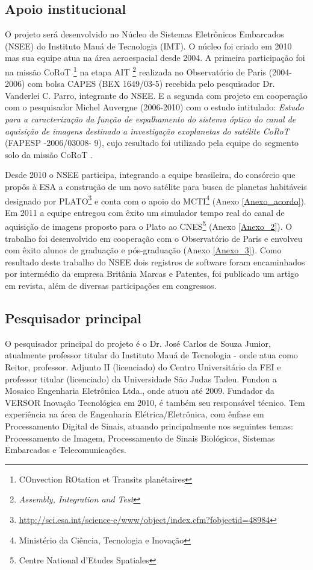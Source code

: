\subsection{Apoio institucional}
O projeto será desenvolvido no Núcleo de Sistemas Eletrônicos Embarcados (NSEE) do Instituto Mauá de Tecnologia (IMT). O núcleo foi criado em 2010 mas sua equipe atua  na área aeroespacial desde 2004. A primeira participação foi na missão CoRoT \footnote{COnvection ROtation et Transits planétaires} na etapa AIT \footnote{\textit{Assembly, Integration and Test}} realizada no Observatório de Paris (2004-2006) com bolsa CAPES (BEX 1649/03-5) recebida pelo pesquisador Dr. Vanderlei C. Parro, integrante do NSEE. E a segunda com projeto em cooperação com o pesquisador Michel Auvergne (2006-2010) com o estudo intitulado:  \textit{Estudo para a caracterização da função de espalhamento do sistema óptico do canal de aquisição de imagens destinado a investigação exoplanetas do satélite CoRoT} (FAPESP -2006/03008- 9), cujo resultado foi utilizado pela equipe do segmento solo da missão CoRoT . 

Desde 2010 o NSEE participa, integrando a equipe brasileira, do consórcio que propôs à ESA a construção de um novo satélite para  busca de planetas habitáveis designado por PLATO\footnote{\url{http://sci.esa.int/science-e/www/object/index.cfm?fobjectid=48984}} e conta com o apoio do MCTI\footnote{Ministério da Ciência, Tecnologia e Inovação} (Anexo \ref{Anexo_acordo}). Em 2011 a equipe entregou com êxito um simulador tempo real do canal de aquisição de imagens proposto para o Plato ao CNES\footnote{Centre National d'Etudes Spatiales} (Anexo \ref{Anexo_2}). O trabalho foi desenvolvido em cooperação com o Observatório de Paris e envolveu com êxito alunos de graduação e pós-graduação (Anexo \ref{Anexo_3}). Como resultado deste trabalho do NSEE dois registros de software foram encaminhados por intermédio da empresa Britânia Marcas e Patentes, foi publicado um artigo em revista, além de diversas participações em congressos.

\subsection{Pesquisador principal}

O pesquisador principal do projeto é o Dr. José Carlos de Souza Junior, atualmente professor titular do Instituto Mauá de Tecnologia - onde atua como Reitor, professor. Adjunto II (licenciado) do Centro Universitário da FEI e professor titular (licenciado) da Universidade São Judas Tadeu. Fundou a Mosaico Engenharia Eletrônica Ltda., onde atuou até 2009. Fundador da VERSOR Inovação Tecnológica em 2010, é também seu responsável técnico. Tem experiência na área de Engenharia Elétrica/Eletrônica, com ênfase em Processamento Digital de Sinais, atuando principalmente nos seguintes temas: Processamento de Imagem, Processamento de Sinais Biológicos, Sistemas Embarcados e Telecomunicações.

